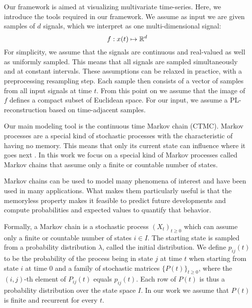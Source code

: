 \label{sec:preliminaries}
Our framework is aimed at visualizing multivariate time-series. Here, we introduce the tools required in our framework. We assume as input we are given samples of $d$ signals, which we interpret as one multi-dimensional signal:
$$f: x(t)\mapsto \mathbb{R}^d$$
For simplicity, we assume that the signals are continuous and real-valued as well as uniformly sampled. This means that all signals are sampled simultaneously and at constant intervals. These assumptions can be relaxed in practice, with a preprocessing resampling step.  Each sample then consists of a vector of samples from all input signals at time $t$. 
From this point on we  assume that the image of $f$ defines a compact subset of Euclidean space. For our input, we assume a PL-reconstruction based on time-adjacent samples. 




Our main modeling tool is the continuous time Markov chain (CTMC). Markov processes are a special kind of stochastic processes with the characteristic of having no memory. This means that only its current state can influence where it goes next \cite{norris1998markov}. In this work we focus on a special kind of Markov processes called Markov chains that assume only a finite or countable number of states.

Markov chains can be used to model many phenomena of interest and have been used in many
applications. What makes them particularly useful is that the memoryless
property makes it feasible to predict future developments and compute probabilities and
expected values to quantify that behavior.

Formally, a Markov chain is a stochastic process $(X_t)_{t \ge 0}$ which can assume 
only a finite or countable number of states $i \in I$. The starting state
is sampled from a probability distribution $\lambda$, called the initial distribution.
We define $p_{ij}(t)$ to be the probability of the process being in state $j$ at time $t$
when starting from state $i$ at time $0$ and a family of stochastic matrices $\{P(t)\}_{t \ge 0}$,
where the $(i,j)$-th element of $P_{ij}(t)$ equals $p_{ij}(t)$.
Each row of $P(t)$ is thus a probability distribution over the state space $I$. In our
work we assume that $P(t)$ is finite and recurrent for every $t$. %

